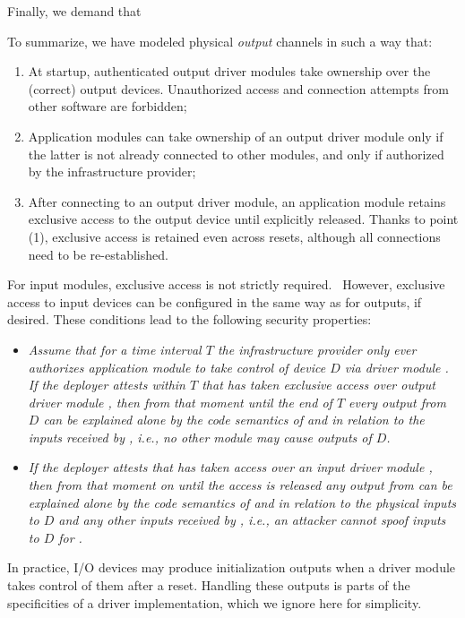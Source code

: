 Finally, we demand that 

To summarize, we have modeled physical \emph{output} channels in such a way that:
%
\begin{enumerate}
    \item  At startup, authenticated output driver modules take
      ownership over the (correct) output devices. Unauthorized access and
      connection attempts from other software are forbidden;
    \item Application modules can take ownership of an output driver module only
      if the latter is not already connected to other modules, and only if
      authorized by the infrastructure provider;
    \item After connecting to an output driver module, an application module
      retains exclusive access to the output device until explicitly released.
       Thanks to point (1), exclusive access is retained even across
      resets, although all connections need to be re-established.
  \end{enumerate}

 For input modules, exclusive access is not strictly
required.~ However, exclusive access to input devices can be
configured in the same way as for outputs, if desired. These conditions lead to
the following security properties:
%
\begin{itemize}
\item \emph{Assume that for a time interval $T$ the infrastructure provider only
  ever authorizes application module  to take control of
  device $D$ via driver module . If the deployer attests within $T$
  that  has taken exclusive access over output driver module
  , then from that moment until the end of $T$ every output from $D$
  can be explained alone by the code semantics of  and  in
  relation to the inputs received by , i.e., no other module may cause
  outputs of $D$.}
\item \emph{If the deployer attests that  has taken access over an
  input driver module , then from that moment on until the access is
  released any output from  can be explained alone by the code
  semantics of  and  in relation to the physical inputs to
  $D$ and any other inputs received by , i.e., an attacker cannot
  spoof inputs to $D$ for .}
\end{itemize}
%
In practice, I/O devices may produce initialization outputs when a
driver module takes control of them after a reset. Handling these outputs
is parts of the specificities of a driver implementation, which we
ignore here for simplicity.

